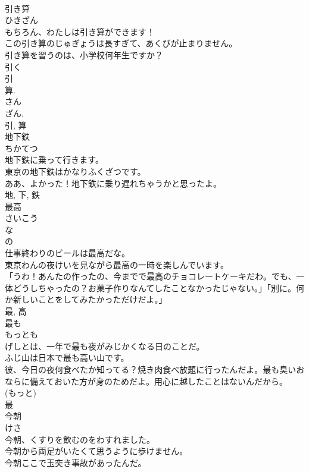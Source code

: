 \documentclass[8pt]{extreport}
\begin{document}
\begin{CJK}{UTF8}{min}
\\	引き算	
\\	ひきざん	
\\	もちろん、わたしは引き算ができます！	
\\	この引き算のじゅぎょうは長すぎて、あくびが止まりません。	
\\	引き算を習うのは、小学校何年生ですか？	
\\	引く 
\\	引 
\\	算. 
\\	さん 
\\	ざん. 
\\	引, 算	
\\	地下鉄	
\\	ちかてつ	
\\	地下鉄に乗って行きます。	
\\	東京の地下鉄はかなりふくざつです。	
\\	ああ、よかった！地下鉄に乗り遅れちゃうかと思ったよ。	
\\	地, 下, 鉄	
\\	最高	
\\	さいこう	
\\	な 
\\	の 
\\	仕事終わりのビールは最高だな。	
\\	東京わんの夜けいを見ながら最高の一時を楽しんでいます。	
\\	「うわ！あんたの作ったの、今までで最高のチョコレートケーキだわ。でも、一体どうしちゃったの？お菓子作りなんてしたことなかったじゃない。」「別に。何か新しいことをしてみたかっただけだよ。」	
\\	最, 高	
\\	最も	
\\	もっとも	
\\	げしとは、一年で最も夜がみじかくなる日のことだ。	
\\	ふじ山は日本で最も高い山です。	
\\	彼、今日の夜何食べたか知ってる？焼き肉食べ放題に行ったんだよ。最も臭いおならに備えておいた方が身のためだよ。用心に越したことはないんだから。	
\\	(もっと) 
\\	最	
\\	今朝	
\\	けさ	
\\	今朝、くすりを飲むのをわすれました。	
\\	今朝から両足がいたくて思うように歩けません。	
\\	今朝ここで玉突き事故があったんだ。	

\end{CJK}
\end{document}
